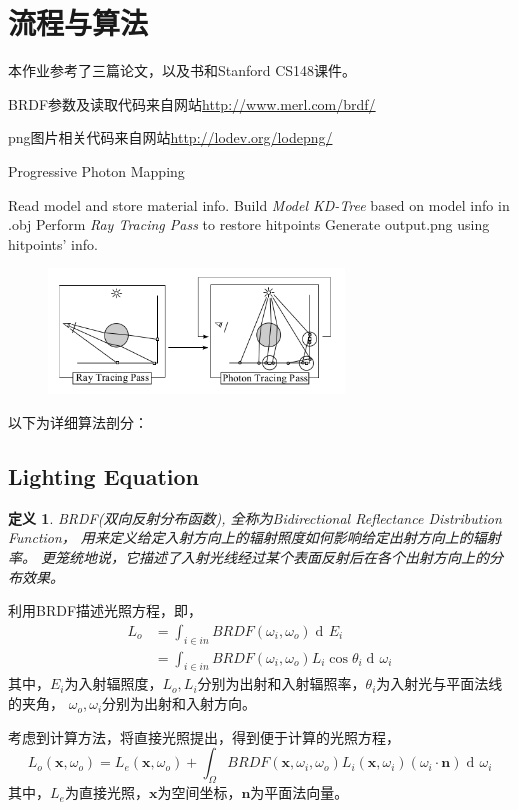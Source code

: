 \documentclass[a4paper,12pt]{article}
\theoremstyle{plain}
\newtheorem{thmdef}{\hspace{\parindent}定义}
\numberwithin{thmdef}{section}
\begin{document}
\section{流程与算法}
本作业参考了三篇论文\cite{ppm}\cite{ppr}\cite{lirui}，以及书\cite{pm}和Stanford CS148课件。\par
BRDF参数及读取代码来自网站\url{http://www.merl.com/brdf/}\par
png图片相关代码来自网站\url{http://lodev.org/lodepng/}
\\
\begin{algorithm}[H]
\caption{Progressive Photon Mapping}
\LinesNumbered
{}
Read model and store material info.\;
Build \textit{Model KD-Tree} based on model info in .obj\;
Perform \textit{Ray Tracing Pass} to restore hitpoints\;
Generate output.png using hitpoints' info.\;
\end{algorithm}\par

\begin{figure}[!h]
\centering
\includegraphics[width=0.7\textwidth]{overall}
\end{figure}
以下为详细算法剖分：
\subsection{Lighting Equation}
\begin{thmdef}
BRDF(双向反射分布函数), 全称为Bidirectional Reflectance Distribution Function，%
用来定义给定入射方向上的辐射照度如何影响给定出射方向上的辐射率。%
更笼统地说，它描述了入射光线经过某个表面反射后在各个出射方向上的分布效果。
\end{thmdef}\par
利用BRDF描述光照方程，即，
\begin{align}
L_o&=\int_{i\in in}BRDF(\omega_i,\omega_o)\mathop{d\!}E_i\\
&=\int_{i\in in}BRDF(\omega_i,\omega_o)L_i\cos\theta_i\mathop{d\!}\omega_i
\end{align}
其中，$E_i$为入射辐照度，$L_o,L_i$分别为出射和入射辐照率，$\theta_i$为入射光与平面法线的夹角，%
$\omega_o,\omega_i$分别为出射和入射方向。\par
考虑到计算方法，将直接光照提出，得到便于计算的光照方程，
\begin{equation}
L_o(\mathbf{x},\omega_o)=L_e(\mathbf{x},\omega_o)+\int_\Omega BRDF(\mathbf{x},\omega_i,%
\omega_o)L_i(\mathbf{x},\omega_i)(\omega_i\cdot\mathbf{n})\mathop{d\!}\omega_i
\end{equation}
其中，$L_e$为直接光照，$\mathbf{x}$为空间坐标，$\mathbf{n}$为平面法向量。
\end{document}
